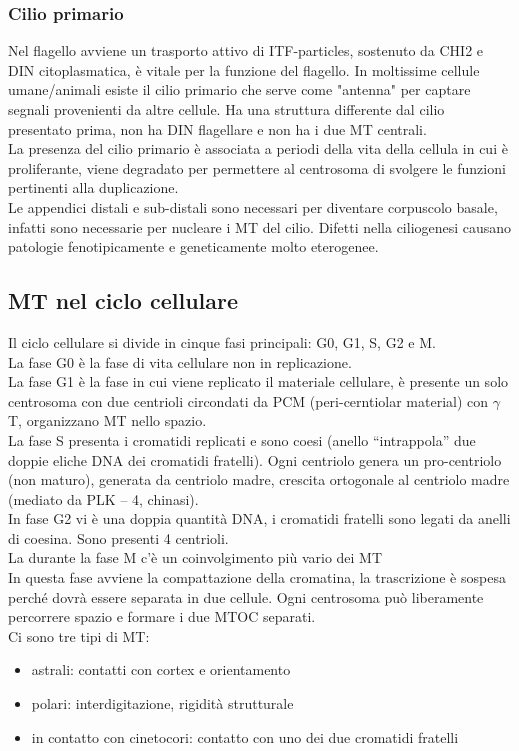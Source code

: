         \subsubsection{Cilio primario}
            Nel flagello avviene un trasporto attivo di ITF-particles, sostenuto da CHI2 e DIN citoplasmatica, è vitale per la funzione del flagello.
            In moltissime cellule umane/animali esiste il cilio primario che serve come "antenna" per captare segnali provenienti da altre cellule. Ha una struttura differente dal cilio presentato prima, non ha DIN flagellare e non ha i due MT centrali.\\
            La presenza del cilio primario è associata a periodi della vita della cellula in cui è proliferante, viene degradato per permettere al centrosoma di svolgere le funzioni pertinenti alla duplicazione.\\
            Le appendici distali e sub-distali sono necessari per diventare corpuscolo basale, infatti sono necessarie per nucleare i MT del cilio. Difetti nella ciliogenesi causano patologie fenotipicamente e geneticamente molto eterogenee.
    
    \subsection{MT nel ciclo cellulare}
        Il ciclo cellulare si divide in cinque fasi principali: G0, G1, S, G2 e M.\\
        La fase G0 è la fase di vita cellulare non in replicazione. \\
        La fase G1 è la fase in cui viene replicato il materiale cellulare, è presente un solo centrosoma con due centrioli circondati da PCM (peri-cerntiolar material) con $\gamma$T, organizzano MT nello spazio.\\
        La fase S presenta i cromatidi replicati e sono coesi (anello “intrappola” due doppie eliche DNA dei cromatidi fratelli).
        Ogni centriolo genera un pro-centriolo (non maturo), generata da centriolo madre, crescita ortogonale al centriolo madre (mediato da PLK – 4, chinasi).\\
        In fase G2 vi è una doppia quantità DNA, i cromatidi fratelli sono legati da anelli di coesina. Sono presenti 4 centrioli.\\
        La durante la fase M c'è un coinvolgimento più vario dei MT\\	In questa fase avviene la compattazione della cromatina, la trascrizione è sospesa perché dovrà essere separata in due cellule. Ogni centrosoma può liberamente percorrere spazio e formare i due MTOC separati. \\
        Ci sono tre tipi di MT:
        \begin{itemize}
            \item astrali: contatti con cortex e orientamento
            \item polari: interdigitazione, rigidità strutturale
            \item in contatto con cinetocori: contatto con uno dei due cromatidi fratelli
        \end{itemize}
        

